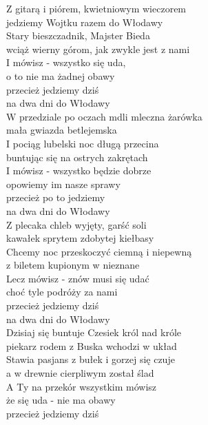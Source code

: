 
Z gitarą i piórem, kwietniowym wieczorem   \\
jedziemy Wojtku razem do Włodawy   \\
Stary bieszczadnik, Majster Bieda   \\
wciąż wierny górom, jak zwykle jest z nami   \\
I mówisz - wszystko się uda, \tab{} \\
o to nie ma żadnej obawy \tab{}  \\
przecież jedziemy dziś \tab{}  \\
na dwa dni do Włodawy \tab{} \\
\hops
W przedziale po oczach mdli mleczna żarówka  \\
mała gwiazda betlejemska  \\
I pociąg lubelski noc długą przecina  \\
buntując się na ostrych zakrętach  \\
I mówisz - wszystko będzie dobrze  \\
opowiemy im nasze sprawy  \\
przecież po to jedziemy  \\
na dwa dni do Włodawy  \\
\hops
Z plecaka chleb wyjęty, garść soli  \\
kawałek sprytem zdobytej kiełbasy  \\
Chcemy noc przeskoczyć ciemną i niepewną \\
z biletem kupionym w nieznane  \\
Lecz mówisz - znów musi się udać  \\
choć tyle podróży za nami  \\
przecież jedziemy dziś  \\
na dwa dni do Włodawy  \\
\hops
Dzisiaj się buntuje Czesiek król nad króle  \\
piekarz rodem z Buska wchodzi w układ  \\
Stawia pasjans z bułek i gorzej się czuje  \\
a w drewnie cierpliwym został ślad  \\
A Ty na przekór wszystkim mówisz  \\
że się uda - nie ma obawy  \\
przecież jedziemy dziś  \\
